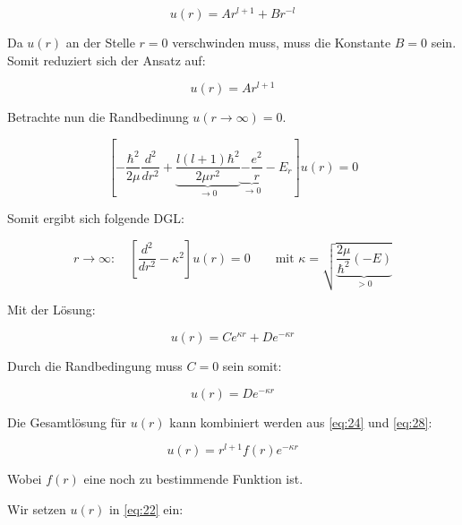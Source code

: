 \begin{equation}
  \label{eq:23}
  u(r) = Ar^{l+1}+Br^{-l}
\end{equation}

Da \(u(r)\) an der Stelle \(r=0\) verschwinden muss, muss die Konstante \(B=0\) sein. Somit reduziert sich der Ansatz auf:

\begin{equation}
  \label{eq:24}
  u(r) = Ar^{l+1}
\end{equation}

Betrachte nun die Randbedinung \(u(r\to \infty) = 0\).

\begin{equation}
  \label{eq:25}
  \left[-\frac{\hbar^2}{2\mu}\frac{d^2}{dr^2} + \underbrace{\frac{l(l+1)\hbar^2}{2\mu r^2}}_{\to 0}  \underbrace{- \frac{e^2}{r} }_{\to 0} - E_r  \right] u(r)   = 0 
\end{equation}

Somit ergibt sich folgende DGL:

\begin{equation}
  \label{eq:26}
  r\to \infty: \quad\left[\frac{d^2}{dr^2} - \kappa^2\right]u(r) = 0 \qquad \text{mit }\kappa = \sqrt{\underbrace{\frac{2\mu}{\hbar^2}(-E)}_{>0}}
\end{equation}

Mit der Lösung:

\begin{equation}
  \label{eq:27}
  u(r) = Ce^{\kappa r}+De^{-\kappa r}
\end{equation}

Durch die Randbedingung muss \(C=0\) sein somit:

\begin{equation}
  \label{eq:28}
    u(r) = De^{-\kappa r}
\end{equation}

Die Gesamtlösung für \(u(r)\) kann kombiniert werden aus \eqref{eq:24} und \eqref{eq:28}:

\begin{equation}
  \label{eq:29}
  u(r) = r^{l+1}f(r)e^{-\kappa r}
\end{equation}

Wobei \(f(r)\) eine noch zu bestimmende Funktion ist.  

Wir setzen \(u(r)\) in \eqref{eq:22} ein:

